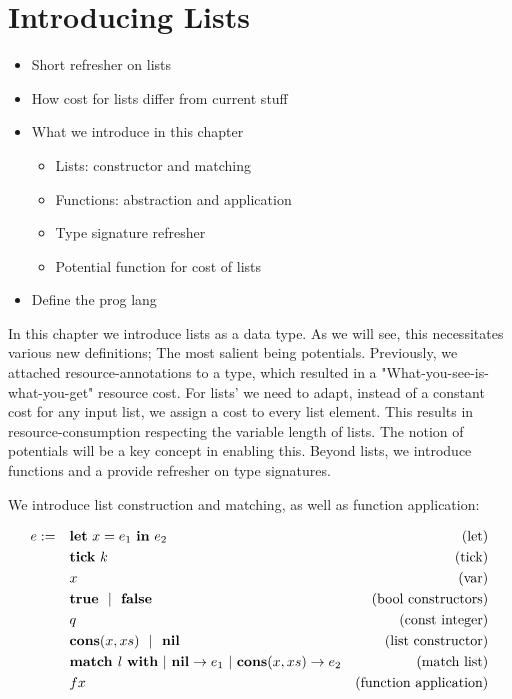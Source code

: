\chapter{Introducing Lists}
\begin{itemize}
   \item Short refresher on lists
   \item How cost for lists differ from current stuff
   \item What we introduce in this chapter
      \begin{itemize}
         \item Lists: constructor and matching
         \item Functions: abstraction and application
         \item Type signature refresher
         \item Potential function for cost of lists
      \end{itemize}
   \item Define the prog lang
\end{itemize}

In this chapter we introduce lists as a data type. As we will see, this necessitates various new definitions; The most salient being potentials. Previously, we attached resource-annotations to a type, which resulted in a "What-you-see-is-what-you-get" resource cost. For lists' we need to adapt, instead of a constant cost for any input list, we assign a cost to every list element. This results in resource-consumption respecting the variable length of lists. The notion of potentials will be a key concept in enabling this. Beyond lists, we introduce functions and a provide refresher on type signatures.

We introduce list construction and matching, as well as function application:


\begin{definition}
   \label{def:prog-lang-6}

\begin{align*}
   e := ~~~ & \mathbf{let}~x = e_1~\mathbf{in}~e_2		& \text{(let)}\\
            & \mathbf{tick}~k				& \text{(tick)}\\
	    & x					& \text{(var)}\\
	    & \mathbf{true} ~~| ~~\mathbf{false}		& \text{(bool constructors)}\\
	    & q					& \text{(const integer)}\\
            & \textbf{cons}(x, xs) ~~| ~~ \textbf{nil}      & \text{(list constructor)}\\
            & \textbf{match } l~\textbf{with}~|~\textbf{nil} \to e_1~|~\textbf{cons}(x, xs) \to e_2           & \text{(match list)}\\
            & f x                               & \text{(function application)}\\
\end{align*}
\end{definition}

